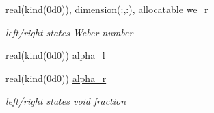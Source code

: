 \begin{Indent}
\begin{DoxyCompactItemize}
real(kind(0d0)), dimension(\+:,\+:), allocatable \hyperlink{namespacem__variables__conversion_a0b984f6015e127568f82af37a3135ceb}{we\+\_\+r}
\begin{DoxyCompactList}\small\item\em left/right states Weber number \end{DoxyCompactList}\item 
real(kind(0d0)) \hyperlink{namespacem__variables__conversion_a77bc35ccbac3dbf5e5a01e4e0219d301}{alpha\+\_\+l}
\item 
real(kind(0d0)) \hyperlink{namespacem__variables__conversion_a5f8751544d985f9e8dba160437f72b12}{alpha\+\_\+r}
\begin{DoxyCompactList}\small\item\em left/right states void fraction \end{DoxyCompactList}\end{DoxyCompactItemize}
\end{Indent}
